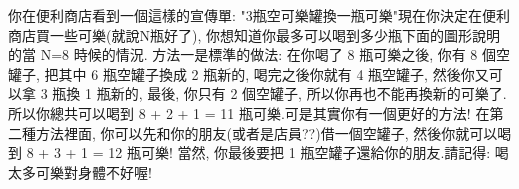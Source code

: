 你在便利商店看到一個這樣的宣傳單: "3瓶空可樂罐換一瓶可樂"現在你決定在便利商店買一些可樂(就說N瓶好了), 你想知道你最多可以喝到多少瓶下面的圖形說明的當 N=8 時候的情況. 方法一是標準的做法: 在你喝了 8 瓶可樂之後, 你有 8 個空罐子, 把其中 6 瓶空罐子換成 2 瓶新的, 喝完之後你就有 4 瓶空罐子, 然後你又可以拿 3 瓶換 1 瓶新的, 最後, 你只有 2 個空罐子, 所以你再也不能再換新的可樂了. 所以你總共可以喝到 8 + 2 + 1 = 11 瓶可樂.可是其實你有一個更好的方法! 在第二種方法裡面, 你可以先和你的朋友(或者是店員??)借一個空罐子, 然後你就可以喝到 8 + 3 + 1 = 12 瓶可樂! 當然, 你最後要把 1 瓶空罐子還給你的朋友.請記得: 喝太多可樂對身體不好喔!